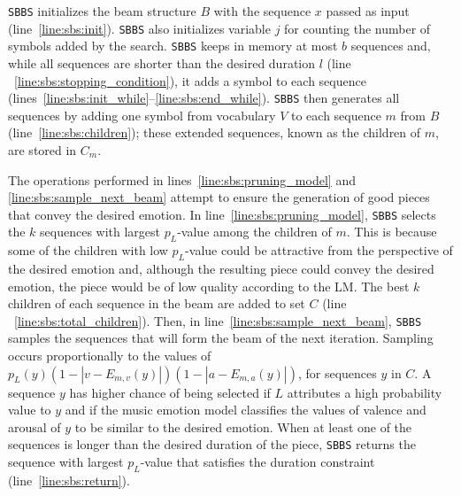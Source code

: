 \texttt{SBBS} initializes the beam structure $B$ with the sequence $x$ passed as input (line~\ref{line:sbs:init}).
\texttt{SBBS} also initializes variable $j$ for counting the number of symbols added by the search. \texttt{SBBS} keeps in memory at most $b$ sequences and, while all sequences are shorter than the desired duration $l$ (line
~\ref{line:sbs:stopping_condition}), it adds a symbol to each sequence (lines~\ref{line:sbs:init_while}--\ref{line:sbs:end_while}). \texttt{SBBS} then generates all sequences by adding one symbol from vocabulary $V$ to each sequence $m$ from $B$ (line~\ref{line:sbs:children}); these extended sequences, known as the children of $m$, are stored in $C_m$.

The operations performed in lines~\ref{line:sbs:pruning_model} and \ref{line:sbs:sample_next_beam} attempt to ensure the generation of good pieces that convey the desired emotion. In line~\ref{line:sbs:pruning_model}, \texttt{SBBS} selects the $k$ sequences with largest $p_L$-value among the children of $m$. This is because some of the children with low $p_L$-value could be attractive from the perspective of the desired emotion and,
although the resulting piece could convey the desired emotion, the piece would be of low quality according to the LM. The best $k$ children of each sequence in the beam are added to set $C$ (line
~\ref{line:sbs:total_children}). Then, in line~\ref{line:sbs:sample_next_beam}, \texttt{SBBS} samples the sequences that will form the beam of the next iteration. Sampling occurs proportionally to the values of $p_L(y) (1 - |v - E_{m,v}(y)|) (1 - |a - E_{m,a}(y)|)$, for sequences $y$ in $C$. A sequence $y$ has higher chance of being selected if $L$ attributes a high probability value to $y$ and if the music emotion model classifies the values of valence and arousal of $y$ to be similar to the desired emotion.
When at least one of the sequences is longer than the desired duration of the piece, \texttt{SBBS} returns the sequence with largest $p_L$-value that satisfies the duration constraint (line~\ref{line:sbs:return}).




